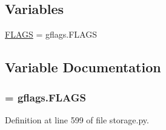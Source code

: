 \subsection*{\-Variables}
\begin{DoxyCompactItemize}
\item 
\hyperlink{namespacestorage_a0d58098ce343c6419ac187acc99415db}{\-F\-L\-A\-G\-S} = gflags.\-F\-L\-A\-G\-S
\end{DoxyCompactItemize}


\subsection{\-Variable \-Documentation}
\hypertarget{namespacestorage_a0d58098ce343c6419ac187acc99415db}{
\subsubsection[{\-F\-L\-A\-G\-S}]{ = gflags.\-F\-L\-A\-G\-S}}
\label{namespacestorage_a0d58098ce343c6419ac187acc99415db}


\-Definition at line 599 of file storage.\-py.

